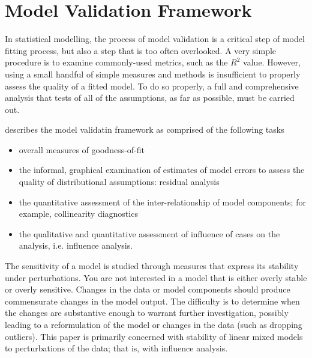 \documentclass[12pt, a4paper]{report}
\theoremstyle{plain}
\theoremstyle{definition}
\theoremstyle{remark}
\begin{document}
\newpage




\section{Model Validation Framework}
In statistical modelling, the process of model validation is a critical step of model fitting process, but also a step that is too often overlooked. A very simple procedure is to examine commonly-used
metrics, such as the $R^2$ value. However, using a small handful of simple measures and methods is insufficient to properly assess the quality of a fitted model. To do so properly, a full and comprehensive
analysis that tests of all of the assumptions, as far as possible, must be carried out.

\citet{schab} describes the model validatin framework as comprised of the following tasks

\begin{itemize}
	\item  overall measures of goodness-of-fit
	\item the informal, graphical examination of estimates of model errors to assess the quality of distributional
	assumptions: residual analysis
	
	
	\item the quantitative assessment of the inter-relationship of model components; for example, collinearity 	diagnostics
	\item the qualitative and quantitative assessment of influence of cases on the analysis, i.e. influence analysis.
\end{itemize}

The sensitivity of a model is studied through measures that express its stability under perturbations. You
are not interested in a model that is either overly stable or overly sensitive. Changes in the data or model
components should produce commensurate changes in the model output. The difficulty is to determine
when the changes are substantive enough to warrant further investigation, possibly leading to a reformulation
of the model or changes in the data (such as dropping outliers). This paper is primarily concerned
with stability of linear mixed models to perturbations of the data; that is, with influence analysis. 
\newpage
\end{document}
